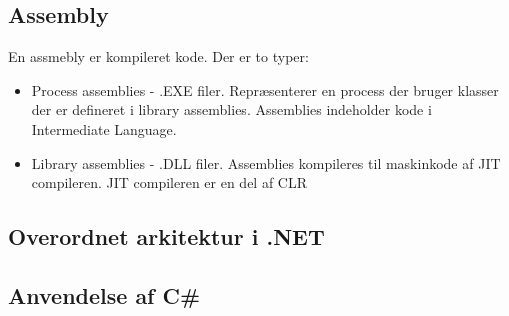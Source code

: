 \subsection{Assembly}
En assmebly er kompileret kode. Der er to typer:
\begin{itemize}
	\item Process assemblies - .EXE filer. Repræsenterer en process der bruger klasser der er defineret i library assemblies. Assemblies indeholder kode i Intermediate Language.
	\item Library assemblies - .DLL filer.
	Assemblies kompileres til maskinkode af JIT compileren. JIT compileren er en del af CLR
\end{itemize}

\subsection{Overordnet arkitektur i .NET}

\subsection{Anvendelse af C\#}